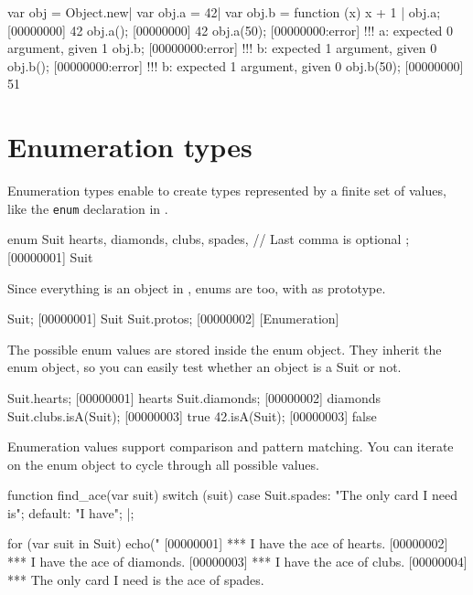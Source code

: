 \begin{urbiscript}
var obj = Object.new|
var obj.a = 42|
var obj.b = function (x) { x + 1 }|
obj.a;
[00000000] 42
obj.a();
[00000000] 42
obj.a(50);
[00000000:error] !!! a: expected 0 argument, given 1
obj.b;
[00000000:error] !!! b: expected 1 argument, given 0
obj.b();
[00000000:error] !!! b: expected 1 argument, given 0
obj.b(50);
[00000000] 51
\end{urbiscript}

\section{Enumeration types}
\label{sec:lang:enum}

Enumeration types enable to create types represented by a finite set of
values, like the \lstinline{enum} declaration in \langC.

\begin{urbiscript}
enum Suit
{
  hearts,
  diamonds,
  clubs,
  spades, // Last comma is optional
};
[00000001] Suit
\end{urbiscript}

Since everything is an object in \us, enums are too, with
 as prototype.

\begin{urbiscript}
Suit;
[00000001] Suit
Suit.protos;
[00000002] [Enumeration]
\end{urbiscript}

The possible enum values are stored inside the enum object. They inherit the
enum object, so you can easily test whether an object is a Suit or not.

\begin{urbiscript}
Suit.hearts;
[00000001] hearts
Suit.diamonds;
[00000002] diamonds
Suit.clubs.isA(Suit);
[00000003] true
42.isA(Suit);
[00000003] false
\end{urbiscript}

Enumeration values support comparison and pattern matching. You can iterate
on the enum object to cycle through all possible values.

\begin{urbiscript}
function find_ace(var suit)
{
  switch (suit)
  {
    case Suit.spades: "The only card I need is";
    default:          "I have";
  }
}|;

for (var suit in Suit)
  echo("%
[00000001] *** I have the ace of hearts.
[00000002] *** I have the ace of diamonds.
[00000003] *** I have the ace of clubs.
[00000004] *** The only card I need is the ace of spades.
\end{urbiscript}

